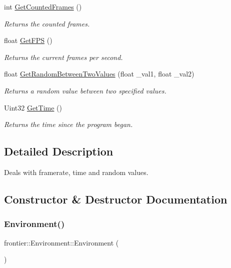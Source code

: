 \begin{DoxyCompactItemize}
int \hyperlink{classfrontier_1_1_environment_af1b717849524c097aedcfab50333bb2b}{Get\+Counted\+Frames} ()
\begin{DoxyCompactList}\small\item\em Returns the counted frames. \end{DoxyCompactList}\item 
float \hyperlink{classfrontier_1_1_environment_ade94afbff85314666664068ca456f525}{Get\+F\+PS} ()
\begin{DoxyCompactList}\small\item\em Returns the current frames per second. \end{DoxyCompactList}\item 
float \hyperlink{classfrontier_1_1_environment_a89853da059a6ed4fc656d2e4f9f0fe07}{Get\+Random\+Between\+Two\+Values} (float \+\_\+val1, float \+\_\+val2)
\begin{DoxyCompactList}\small\item\em Returns a random value between two specified values. \end{DoxyCompactList}\item 
Uint32 \hyperlink{classfrontier_1_1_environment_afd2f6618895ffc061577512f318ab990}{Get\+Time} ()
\begin{DoxyCompactList}\small\item\em Returns the time since the program began. \end{DoxyCompactList}\end{DoxyCompactItemize}


\subsection{Detailed Description}
Deals with framerate, time and random values. 

\subsection{Constructor \& Destructor Documentation}
\mbox{\label{classfrontier_1_1_environment_a5134f0589b326bb3ca0dad342c11b8f4}} 
\subsubsection{\texorpdfstring{Environment()}{Environment()}}
{\footnotesize\ttfamily frontier\+::\+Environment\+::\+Environment (\begin{DoxyParamCaption}{ }\end{DoxyParamCaption})}



